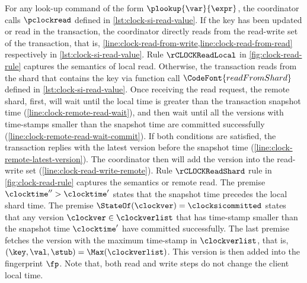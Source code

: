 For any look-up command of the form \( \plookup{\var}{\expr}\),
the coordinator calls \( \pclockread \) defined in \cref{lst:clock-si-read-value}.
If the key has been updated or read in the transaction, 
the coordinator directly reads from the read-write set of the transaction,
that is, \cref{line:clock-read-from-write,line:clock-read-from-read} respectively in \cref{lst:clock-si-read-value}.
Rule \( \rCLOCKReadLocal \) in \cref{fig:clock-read-rule} captures the semantics of local read.
Otherwise, the transaction reads from the shard that contains the key via function call \( \CodeFont{readFromShard}\) defined in \cref{lst:clock-si-read-value}.
Once receiving the read request,
the remote shard, first, will wait until the local time is greater than the transaction snapshot time (\cref{line:clock-remote-read-wait}),
and then wait until all the versions with time-stamps smaller than the snapshot time are committed successfully (\cref{line:clock-remote-read-wait-commit}).
If both conditions are satisfied,
the transaction replies with the latest version before the snapshot time (\cref{line:clock-remote-latest-version}).
The coordinator then will add the version into the read-write set (\cref{line:clock-read-write-remote}).
Rule \( \rCLOCKReadShard \) rule in \cref{fig:clock-read-rule} captures the semantics or remote read.
The premise \(\clocktime'' > \clocktime'\) states that the snapshot time precedes the local shard time.
The premise \( \StateOf(\clockver) = \clocksicommitted  \) states that
any version \( \clockver \in \clockverlist \) that has time-stamp smaller than the snapshot time \( \clocktime' \) have committed successfully.
The last premise fetches the version with the maximum time-stamp in \( \clockverlist\),
that is, \( (\key,\val,\stub) = \Max(\clockverlist) \).
This version is then added into the fingerprint \( \fp \).
Note that, both read and write steps do not change the client local time.



